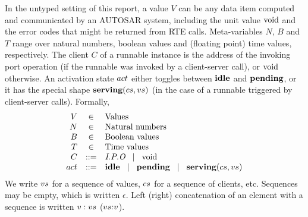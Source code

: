 \documentclass[twocolumn]{article}
\begin{document}
In the untyped setting of this report, a value $V$ can be any data item computed and communicated by an AUTOSAR system, including the unit value $\text{void}$ and the error codes that might be returned from RTE calls. Meta-variables $N$, $B$ and $T$ range over natural numbers, boolean values and (floating point) time values, respectively. The client $C$ of a runnable instance is the address of the invoking port operation (if the runnable was invoked by a client-server call), or $\text{void}$ otherwise. An activation state $\Act$ either toggles between $\textbf{idle}$ and $\textbf{pending}$, or it has the special shape $\serving{\Cs}{\Vs}$ (in the case of a runnable triggered by client-server calls). Formally,
\[
\begin{array}{rcll}
	V	& \in		& \text{Values} \\
	N	& \in		& \text{Natural numbers} \\
	B	& \in		& \text{Boolean values} \\
	T	& \in		& \text{Time values} \\
	C	& ::=		& \Top{O}{P}{I} \sep \Tvoid \\
	\Act	& ::=		& \Tidle \sep \Tpending \sep \serving{\Cs}{\Vs} \\
\end{array}
\]
We write $\Vs$ for a sequence of values, $\Cs$ for a sequence of clients, etc. Sequences may be empty, which is written $\epsilon$. Left (right) concatenation of an element with a sequence is written $\Tcons{\V{V}}{\V{Vs}}$ ($\Tsnoc{\V{Vs}}{\V{V}}$).
\end{document}
